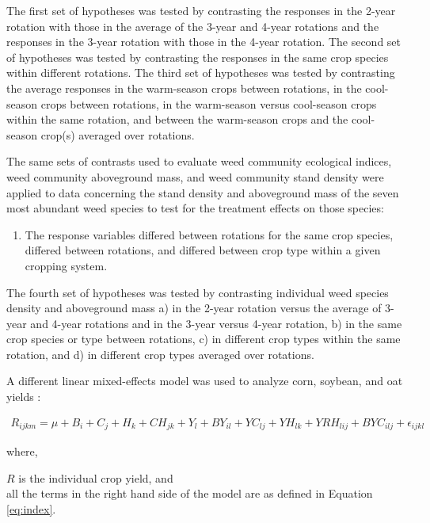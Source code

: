 \documentclass[
]{article}
\providecommand{\tightlist}{%
  \setlength{\itemsep}{0pt}\setlength{\parskip}{0pt}}
\begin{document}
The first set of hypotheses was tested by contrasting the responses in the 2-year rotation with those in the average of the 3-year and 4-year rotations and the responses in the 3-year rotation with those in the 4-year rotation. The second set of hypotheses was tested by contrasting the responses in the same crop species within different rotations. The third set of hypotheses was tested by contrasting the average responses in the warm-season crops between rotations, in the cool-season crops between rotations, in the warm-season versus cool-season crops within the same rotation, and between the warm-season crops and the cool-season crop(s) averaged over rotations.

The same sets of contrasts used to evaluate weed community ecological indices, weed community aboveground mass, and weed community stand density were applied to data concerning the stand density and aboveground mass of the seven most abundant weed species to test for the treatment effects on those species:

\begin{enumerate}
\def\labelenumi{\arabic{enumi})}
\setcounter{enumi}{3}
\tightlist
\item
  The response variables differed between rotations for the same crop species, differed between rotations, and differed between crop type within a given cropping system.
\end{enumerate}

The fourth set of hypotheses was tested by contrasting individual weed species density and aboveground mass a) in the 2-year rotation versus the average of 3-year and 4-year rotations and in the 3-year versus 4-year rotation, b) in the same crop species or type between rotations, c) in different crop types within the same rotation, and d) in different crop types averaged over rotations.

A different linear mixed-effects model was used to analyze corn, soybean, and oat yields \citep[\texttt{lme4} version 1.1-27.1,][]{batesLme4LinearMixedEffects2021}:

\begin{align}
R_{ijkm} = \mu + B_i + C_j + H_k + CH_{jk} + Y_l + BY_{il} + YC_{lj} + YH_{lk}  + YRH_{lij} + BYC_{ilj} + \epsilon_{ijkl}
\label{eq:yield}
\end{align}

where,

\(R\) is the individual crop yield, and\\
all the terms in the right hand side of the model are as defined in Equation \eqref{eq:index}.
\end{document}

